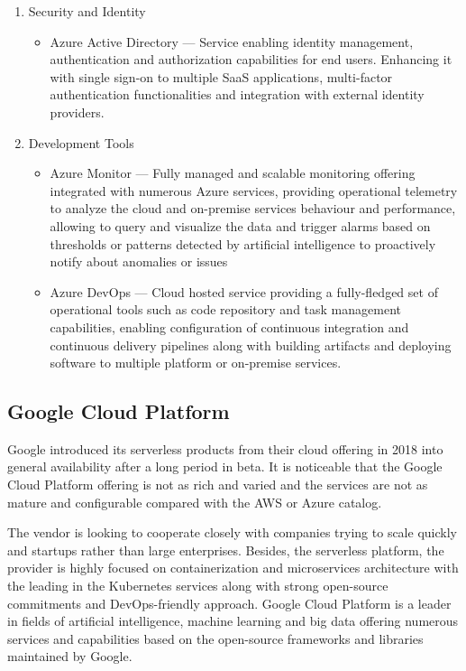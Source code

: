 \begin{enumerate}
   \item Security and Identity
   \begin{itemize}
       \item Azure Active Directory --- Service enabling identity management, authentication and authorization capabilities for end users. Enhancing it with single sign-on to multiple SaaS applications, multi-factor authentication functionalities and integration with external identity providers.
   \end{itemize}
   \item Development Tools
   \begin{itemize}
       \item Azure Monitor --- Fully managed and scalable monitoring offering integrated with numerous Azure services, providing operational telemetry to analyze the cloud and on-premise services behaviour and performance, allowing to query and visualize the data and trigger alarms based on thresholds or patterns detected by artificial intelligence to proactively notify about anomalies or issues
       \item Azure DevOps --- Cloud hosted service providing a fully-fledged set of operational tools such as code repository and task management capabilities, enabling configuration of continuous integration and continuous delivery pipelines along with building artifacts and deploying software to multiple platform or on-premise services.
   \end{itemize}
\end{enumerate}

\subsection{Google Cloud Platform}

Google introduced its serverless products from their cloud offering in 2018 into general availability after a long period in beta. It is noticeable that the Google Cloud Platform offering is not as rich and varied and the services are not as mature and configurable compared with the AWS or Azure catalog.

The vendor is looking to cooperate closely with companies trying to scale quickly and startups rather than large enterprises. Besides, the serverless platform, the provider is highly focused on containerization and microservices architecture with the leading in the Kubernetes services along with strong open-source commitments and DevOps-friendly approach. Google Cloud Platform is a leader in fields of artificial intelligence, machine learning and big data offering numerous services and capabilities based on the open-source frameworks and libraries maintained by Google.

